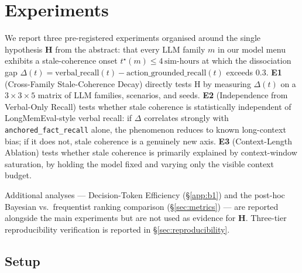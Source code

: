 \section{Experiments}
\label{sec:experiments}

We report three pre-registered experiments organised around the
single hypothesis \textbf{H} from the abstract: that every LLM
family $m$ in our model menu exhibits a stale-coherence onset
$t^{\star}(m) \leq 4\,\text{sim-hours}$ at which the dissociation
gap $\Delta(t) = \text{verbal\_recall}(t) - \text{action\_grounded\_recall}(t)$
exceeds $0.3$.
\textbf{E1} (Cross-Family Stale-Coherence Decay) directly tests H by
measuring $\Delta(t)$ on a $3 \times 3 \times 5$ matrix of LLM
families, scenarios, and seeds.
\textbf{E2} (Independence from Verbal-Only Recall) tests whether
stale coherence is statistically independent of LongMemEval-style
verbal recall: if $\Delta$ correlates strongly with
\texttt{anchored\_fact\_recall} alone, the phenomenon reduces to
known long-context bias; if it does not, stale coherence is a
genuinely new axis.
\textbf{E3} (Context-Length Ablation) tests whether stale coherence
is primarily explained by context-window saturation, by holding the
model fixed and varying only the visible context budget.

Additional analyses --- Decision-Token Efficiency (\S\ref{app:b1})
and the post-hoc Bayesian vs.\ frequentist ranking comparison
(\S\ref{sec:metrics}) --- are reported alongside the main
experiments but are not used as evidence for \textbf{H}. Three-tier
reproducibility verification is reported in
\S\ref{sec:reproducibility}.

\subsection{Setup}
\label{sec:exp:setup}

